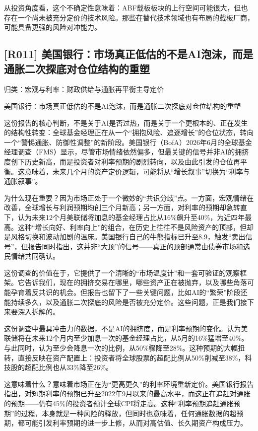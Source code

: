 \documentclass[11pt]{ctexart}
\begin{document}
从投资角度看，这个不确定性意味着：ABF载板板块的上行空间可能很大，但也存在一个尚未被充分定价的技术风险。那些在替代技术领域也有布局的载板厂商，可能具备更强的风险对冲能力。

\subsection{[R011] 美国银行：市场真正低估的不是AI泡沫，而是通胀二次探底对仓位结构的重塑}
{\small\color{refgray}归类：宏观与利率：财政供给与通胀再平衡主导定价}

美国银行：市场真正低估的不是AI泡沫，而是通胀二次探底对仓位结构的重塑

这份报告的核心判断，不是关于AI是否过热，而是关于一个更根本的、正在发生的结构性转变：全球基金经理正在从一个“拥抱风险、追逐增长”的仓位状态，转向一个“警惕通胀、防御性调整”的新阶段。美国银行（BofA）2026年6月的全球基金经理调查（FMS）显示，尽管市场情绪依然偏多，但最关键的信号并非AI的拥挤度创下历史新高，而是投资者对利率预期的剧烈转向，以及由此引发的仓位再平衡。这意味着，未来几个月的资产定价逻辑，可能将从“增长叙事”切换为“利率与通胀叙事”。

为什么现在重要？因为市场正处于一个微妙的“共识分歧”点。一方面，宏观情绪在改善，全球增长与利润预期均创三个月新高；另一方面，对利率的预期却急转直下，认为未来12个月美联储将加息的基金经理占比从16\%飙升至40\%，为近四年最高。这种“增长向好、利率向上”的组合，在历史上往往不是风险资产的顶部，但却是风格切换和波动加剧的温床。美国银行自己的牛熊指标已升至8.9，触发“卖出信号”，但报告同时指出，这并非“大顶”的信号——真正的顶部通常由债券市场和选民情绪共同确认。

这份调查的价值在于，它提供了一个清晰的“市场温度计”和一套可验证的观察框架。它告诉我们，现在的拥挤交易在哪里，哪些资产正在被抛弃，以及哪些角落可能孕育着反共识的机会。但报告也留下了一些关键问题，比如AI的“繁荣”阶段还能持续多久，以及通胀二次探底的风险是否被充分定价。这些问题，正是我们接下来要深入拆解的。

这份调查中最具冲击力的数据，不是AI的拥挤度，而是利率预期的变化。认为美联储将在未来12个月内至少加息一次的基金经理占比，从5月的16\%猛增至40\%。与此同时，认为至少会降息一次的比例，从50\%骤降至28\%。这种预期的大幅扭转，直接反映在资产配置上：投资者将全球股票的超配比例从50\%削减至38\%，科技股的超配比例也从33\%降至26\%。

这意味着什么？意味着市场正在为“更高更久”的利率环境重新定价。美国银行报告指出，对短期利率的预期已升至2022年9月以来的最高水平，而这正在追赶对通胀的预期——仍有45\%的投资者预计全球CPI将走高。这种“利率预期追赶通胀预期”的过程，本身就是一种风险的释放，但同时也意味着，任何通胀数据的超预期，都可能引发利率预期的进一步上修，从而对高估值、长久期资产构成压力。
\end{document}

